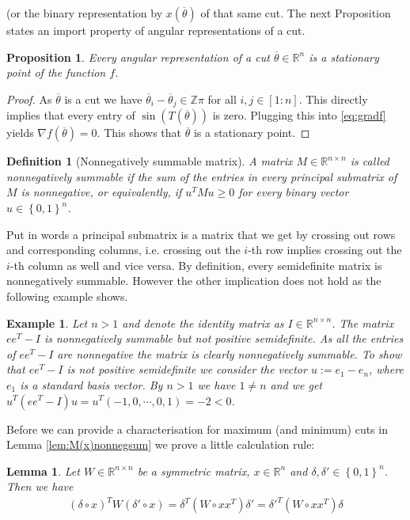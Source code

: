 \documentclass[12pt,a4paper]{article}
\theoremstyle{mythm}
\newtheorem{Def}[thm]{Definition}
\newtheorem{prop}[thm]{Proposition}
\newtheorem{lem}[thm]{Lemma}
\newtheorem*{exa}{Example}
\begin{document}
(or the binary representation by $ x ( \overline{ \theta } ) $ of that same cut.
The next Proposition states an import property of angular representations of a cut.
\begin{prop}
\label{prop:cutsArestationaryPoints} 
Every angular representation of a cut $ \overline{ \theta } \in \mathbb{R} ^{ n }  $ is a stationary point of the function $ f $.
\end{prop} 
\begin{proof}
As $ \overline{ \theta } $ is a cut we have $ \overline{ \theta } _{ i } - \overline{ \theta } _{ j } \in \mathbb{Z} \pi  $ for all $ i,j \in \left[ 1:n \right]  $. 
This directly implies that every entry of $ \sin( T ( \overline{ \theta } ) )  $ is zero. Plugging this into \ref{eq:gradf} yields $ \nabla f ( \overline{ \theta } ) = 0$.
This shows that $ \overline{ \theta }  $ is a stationary point.
\end{proof}
\begin{Def}[Nonnegatively summable matrix]
A matrix $ M \in \mathbb{R} ^{ n \times n }  $ is called nonnegatively summable if the sum of the entries in every principal submatrix of $ M $ is nonnegative, or
equivalently, if $ u ^{ T} M u \geq 0    $ for every binary vector $ u \in \left\{ 0,1 \right\} ^{ n }  $.
\end{Def} 
Put in words a principal submatrix is a matrix that we get by crossing out rows and corresponding columns, i.e. crossing out the $ i$-th row implies crossing out the $ i
$-th column as well and vice versa.
By definition, every semidefinite matrix is nonnegatively summable. However the other implication does not hold as the following example shows.
\begin{exa}
Let $ n>1 $ and denote the identity matrix as $ I \in \mathbb{R} ^{ n \times n }  $.
The matrix $ ee^T - I $ is nonnegatively summable but not positive semidefinite.
As all the entries of $ ee^T - I $ are nonnegative the matrix is clearly nonnegatively summable.
To show that $ ee^T - I $ is not positive semidefinite we consider the vector $ u := e_1 - e_n $, where $ e_1 $ is a standard basis vector. By $ n>1  $ we have $ 1 \neq n  $ and we get 
$ u ^T \left( ee^T - I \right) u = u^T \left( -1,0, \cdots, 0,1 \right) = -2 < 0  $.
\end{exa} 
Before we can provide a characterisation for maximum (and minimum) cuts in Lemma \ref{lem:M(x)nonnegsum} we prove a little calculation rule:
\begin{lem}
\label{lem:calcrule} 
Let $ W \in \mathbb{R} ^{ n \times n }  $ be a symmetric matrix, $ x \in \mathbb{R} ^{ n } $ and $ \delta,  \delta ' \in \left\{ 0,1 \right\} ^{ n }  $.
Then we have
\begin{align*}
\left( \delta \circ x \right) ^T W \left(  \delta '  \circ x \right) = \delta ^T \left( W \circ x x ^T  \right)  \delta ' =  \delta '^T \left( W \circ x x ^T  \right) \delta
\end{align*} 
\end{lem} 
\end{document}
